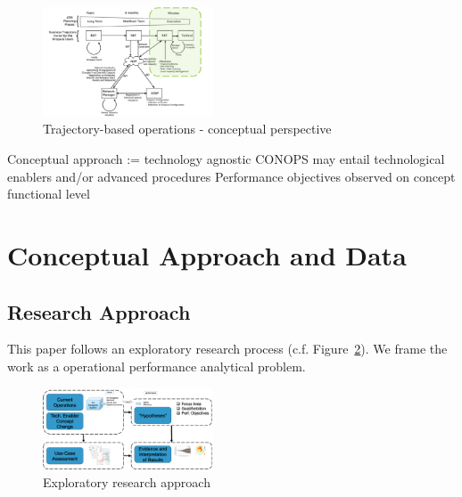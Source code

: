 \documentclass[letterpaper, 10 pt, journal, twoside]{IEEEtran}
\begin{document}
\begin{figure}

{\centering \includegraphics[width=0.45\textwidth,height=\textheight]{./figures/TBO-concept.png}

}

\caption{\label{fig-TBO-concept}Trajectory-based operations - conceptual
perspective}

\end{figure}

Conceptual approach := technology agnostic CONOPS may entail
technological enablers and/or advanced procedures Performance objectives
observed on concept functional level

\hypertarget{conceptual-approach-and-data}{%
\section{Conceptual Approach and
Data}\label{conceptual-approach-and-data}}

\hypertarget{research-approach}{%
\subsection{Research Approach}\label{research-approach}}

This paper follows an exploratory research process (c.f.
Figure~\ref{fig-research-approach}). We frame the work as a operational
performance analytical problem.

\begin{figure}

{\centering \includegraphics[width=0.45\textwidth,height=\textheight]{./figures/exploratory-research-concept.png}

}

\caption{\label{fig-research-approach}Exploratory research approach}

\end{figure}
\end{document}
